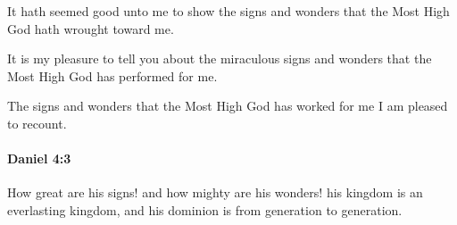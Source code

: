 			\begin{versebox}
					\item[BHS] 
					\item[LXX] 
					\item[ASV] It hath seemed good unto me to show the signs and wonders that the Most High God hath wrought toward me.
					\item[NIV] It is my pleasure to tell you about the miraculous signs and wonders that the Most High God has performed for me.
					\item[NRSV] The signs and wonders that the Most High God has worked for me I am pleased to recount.
			\end{versebox}

		\paragraph{Daniel 4:3} %
			\label{DANIEL-4-3}

			How great are his signs! and how mighty are his wonders! his kingdom is an everlasting kingdom, and his dominion is from generation to generation.

